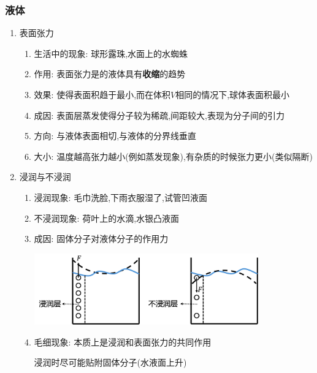 \documentclass{article}
\begin{document}
\subsubsection{液体}
\begin{enumerate}
    \item 表面张力
          \begin{enumerate}[label = (\arabic*)]
              \item 生活中的现象: 球形露珠,水面上的水蜘蛛
              \item 作用: 表面张力是的液体具有\textbf{收缩}的趋势
              \item 效果: 使得表面积趋于最小,而在体积$V$相同的情况下,球体表面积最小
              \item 成因: 表面层蒸发使得分子较为稀疏,间距较大,表现为分子间的引力
              \item 方向: 与液体表面相切,与液体的分界线垂直
              \item 大小: 温度越高张力越小(例如蒸发现象),有杂质的时候张力更小(类似隔断)
          \end{enumerate}
    \item 浸润与不浸润
          \begin{enumerate}[label = (\arabic*)]
              \item 浸润现象: 毛巾洗脸,下雨衣服湿了,试管凹液面
              \item 不浸润现象: 荷叶上的水滴,水银凸液面
              \item 成因: 固体分子对液体分子的作用力

                    \begin{center}
                        \includegraphics[width = 0.8\textwidth]{./pictures/24.png}
                    \end{center}

              \item 毛细现象: 本质上是浸润和表面张力的共同作用

                    \hspace{4.7em}\begin{minipage}{0.7\textwidth}
                        浸润时尽可能贴附固体分子(水液面上升)


\end{minipage}
\end{enumerate}
\end{enumerate}
\end{document}

